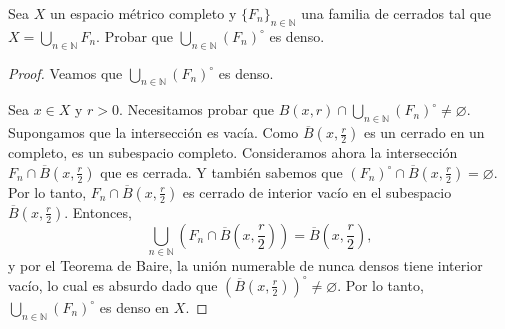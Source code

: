 \begin{exercise}
    Sea $X$ un espacio métrico completo y $\{F_n\}_{n \in \mathbb{N}}$ una familia de cerrados tal que $X = \bigcup_{n \in \mathbb{N}} F_n$. Probar que $\bigcup_{n \in \mathbb{N}} (F_n)^{\circ}$ es denso.
\end{exercise}

\begin{proof}
    Veamos que $\bigcup_{n \in \mathbb{N}} (F_n)^{\circ}$ es denso. 
    
    Sea $x \in X$ y $r > 0$. Necesitamos probar que $B(x, r) \cap \bigcup_{n \in \mathbb{N}} (F_n)^{\circ} \neq \varnothing$. Supongamos que la intersección es vacía. Como $\overline{B}\left(x, \frac{r}{2}\right)$ es un cerrado en un completo, es un subespacio completo. Consideramos ahora la intersección $F_n \cap \overline{B}\left(x, \frac{r}{2}\right)$ que es cerrada. Y también sabemos que $(F_n)^{\circ} \cap \overline{B}\left(x, \frac{r}{2}\right) = \varnothing$. Por lo tanto, $F_n \cap \overline{B}\left(x, \frac{r}{2}\right)$ es cerrado de interior vacío en el subespacio $\overline{B}\left(x, \frac{r}{2}\right)$. Entonces,
    \begin{equation*}
        \bigcup_{n \in \mathbb{N}} \left(F_n \cap \overline{B}\left(x, \frac{r}{2}\right)\right) = \overline{B}\left(x, \frac{r}{2}\right),
    \end{equation*}
    y por el Teorema de Baire, la unión numerable de nunca densos tiene interior vacío, lo cual es absurdo dado que $(\overline{B}\left(x, \frac{r}{2}\right))^{\circ} \neq \varnothing$. Por lo tanto, $\bigcup_{n \in \mathbb{N}} (F_n)^{\circ}$ es denso en $X$.
\end{proof}